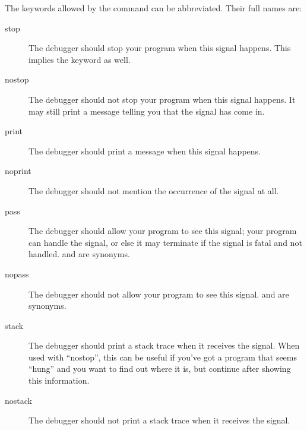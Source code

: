 The keywords allowed by the  command can be abbreviated.
Their full names are:

\begin{description}
\item[stop]
The debugger should stop your program when this signal happens.  This implies
the  keyword as well.

\item[nostop]
The debugger should not stop your program when this signal happens.  It may
still print a message telling you that the signal has come in.

\item[print]
The debugger should print a message when this signal happens.

\item[noprint]
The debugger should not mention the occurrence of the signal at all.  

\item[pass]
The debugger should allow your program to see this signal; your program
can handle the signal, or else it may terminate if the signal is fatal
and not handled.   and  are synonyms.

\item[nopass]
The debugger should not allow your program to see this signal.
 and  are synonyms.

\item[stack]

The debugger should print a stack trace when it receives the
signal. When used with ``nostop'', this can be useful if you've got a
program that seems ``hung'' and you want to find out where it is, but
continue after showing this information.

\item[nostack]
The debugger should not print a stack trace when it receives the signal.
\end{description}

